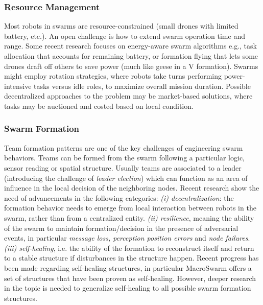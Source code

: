 \documentclass[12pt]{article}
\begin{document}
\subsubsection{Resource Management}
Most robots in swarms are resource-constrained (small drones with limited battery, etc.). An open challenge is how to extend swarm operation time and range. 
Some recent research focuses on energy-aware swarm algorithms e.g., task allocation that accounts for remaining battery, or formation flying that lets some drones draft off others to save power (much like geese in a V formation). 
Swarms might employ rotation strategies, where robots take turns performing power-intensive tasks versus idle roles, to maximize overall mission duration.
Possible decentralized approaches to the problem may be market-based solutions, where tasks may be auctioned and costed based on local condition.

\subsubsection{Swarm Formation}
Team formation patterns are one of the key challenges of engineering swarm behaviors. 
Teams can be formed from the swarm following a particular logic, sensor reading or spatial structure. Usually teams 
are associated to a leader (introducing the challenge of \textit{leader election}) which can function as an area of influence in the
local decision of the neighboring nodes. Recent research show the need of advancements in the following categories:
\textit{(i) decentralization}: the formation behavior needs to emerge from local interaction between robots in the swarm, rather than from a centralized entity. 
\textit{(ii) resilience}, meaning the ability of the swarm to maintain formation/decision
in the presence of adversarial events, in particular \textit{message loss, perception position errors} and \textit{node failures}.
\textit{(iii) self-healing}, i.e. the ability of the formation to reconstruct itself and return to a stable structure if disturbances in the structure happen. Recent progress has been made
regarding self-healing structures, in particular MacroSwarm offers a set of structures that have been proven as self-healing. However, deeper research in the topic is needed to generalize self-healing
to all possible swarm formation structures.
\end{document}
